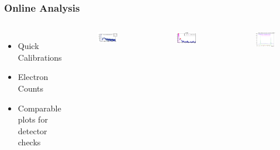 \documentclass{beamer}
\begin{document}

\begin{frame}
\frametitle{Online Analysis}
\begin{block}{}
\begin{columns}

		\begin{itemize}
			\item Quick Calibrations
			\item Electron Counts
			\item Comparable plots for detector checks
		\end{itemize}

	\begin{figure}
		\includegraphics[width=5cm]{../images/det_check}
	\end{figure}

	\begin{figure}
		\includegraphics[width=5cm]{../images/cer_ped}
	\end{figure}
	\vspace{-20pt}
	\begin{figure}
		\includegraphics[width=5cm]{../images/G_E}
	\end{figure}

\end{columns}
\end{block}
\end{frame}
\end{document}
